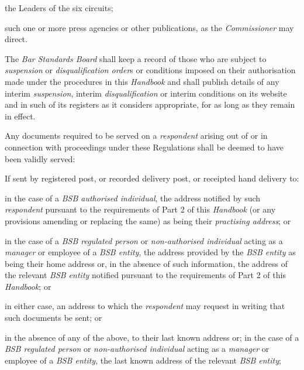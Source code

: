 \item the Leaders of the six circuits;\\
\item such one or more press agencies or other publications, as
the \emph{Commissioner} may direct.\la\ln
{}\par
The \emph{Bar Standards Board} shall keep a record of those who are
subject to \emph{suspension} or \emph{disqualification order}s or
conditions imposed on their authorisation made under the procedures in
this \emph{Handbook} and shall publish details of any
interim \emph{suspension}, interim \emph{disqualification} or interim
conditions on its website and in such of its registers as it considers
appropriate, for as long as they remain in effect.\\
\par
{}
Any documents required to be served on a \emph{respondent} arising out
of or in connection with proceedings under these Regulations shall be
deemed to have been validly served:\\\nl \item If sent by registered post, or recorded delivery post, or receipted
hand delivery to:\al
\item  in the case of a \emph{BSB authorised individual}, the address
notified by such \emph{respondent} pursuant to the requirements of Part
2 of this \emph{Handbook} (or any provisions amending or replacing the
same) as being their \emph{practising address}; or\\
\item  in the case of a \emph{BSB regulated person} or \emph{non-authorised
individual} acting as a \emph{manager} or\textbf{ }employee of
a \emph{BSB entity}, the address provided by the \emph{BSB entity} as
being their home address or, in the absence of such information, the
address of the relevant \emph{BSB entity} notified pursuant to the
requirements of Part 2 of this \emph{Handbook}; or\\
\item  in either case, an address to which the \emph{respondent} may request
in writing that such documents be sent; or\\
\item in the absence of any of the above, to their last known address or;
in the case of a \emph{BSB regulated person} or \emph{non-authorised
individual} acting as a \emph{manager} or\textbf{ }employee of
a \emph{BSB entity}, the last known address of the relevant \emph{BSB
entity};\la
